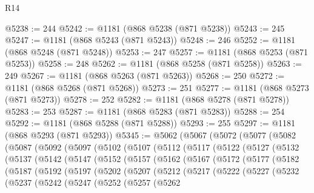 \begin{lexlean}{R14}
\begin{coremodule}
@5238 := 244
@5242 := @1181 (@868 @5238 (@871 @5238))
@5243 := 245
@5247 := @1181 (@868 @5243 (@871 @5243))
@5248 := 246
@5252 := @1181 (@868 @5248 (@871 @5248))
@5253 := 247
@5257 := @1181 (@868 @5253 (@871 @5253))
@5258 := 248
@5262 := @1181 (@868 @5258 (@871 @5258))
@5263 := 249
@5267 := @1181 (@868 @5263 (@871 @5263))
@5268 := 250
@5272 := @1181 (@868 @5268 (@871 @5268))
@5273 := 251
@5277 := @1181 (@868 @5273 (@871 @5273))
@5278 := 252
@5282 := @1181 (@868 @5278 (@871 @5278))
@5283 := 253
@5287 := @1181 (@868 @5283 (@871 @5283))
@5288 := 254
@5292 := @1181 (@868 @5288 (@871 @5288))
@5293 := 255
@5297 := @1181 (@868 @5293 (@871 @5293))
@5345 := @5062
    (@5067
      (@5072
        (@5077
          (@5082
            (@5087
              (@5092
                (@5097
                  (@5102
                    (@5107
                      (@5112
                        (@5117
                          (@5122
                            (@5127
                              (@5132
                                (@5137
                                  (@5142
                                    (@5147
                                      (@5152
                                        (@5157
                                          (@5162
                                            (@5167
                                              (@5172
                                                (@5177
                                                  (@5182
                                                    (@5187
                                                      (@5192
                                                        (@5197
                                                          (@5202
                                                            (@5207
                                                              (@5212
                                                                (@5217
                                                                  (@5222
                                                                    (@5227
                                                                      (@5232
                                                                        (@5237
                                                                          (@5242
                                                                            (@5247
                                                                              (@5252
                                                                                (@5257
                                                                                  (@5262

\end{coremodule}
\end{lexlean}
